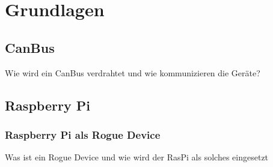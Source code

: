 \chapter{Grundlagen}


\section{CanBus}
Wie wird ein CanBus verdrahtet und wie kommunizieren die Geräte?

\section{Raspberry Pi}

\subsection{Raspberry Pi als Rogue Device}
Was ist ein Rogue Device und wie wird der RasPi als solches eingesetzt